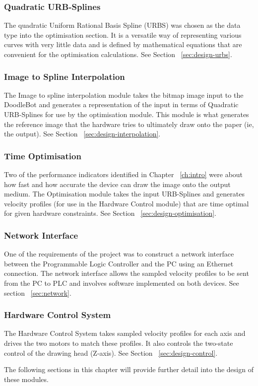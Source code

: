 	\subsubsection*{Quadratic URB-Splines}
		The quadratic Uniform Rational Basis Spline (URBS) was chosen as the data type into the optimisation section. It is a versatile way of representing various curves with very little data and is defined by mathematical equations that are convenient for the optimisation calculations. See Section ~\ref{sec:design-urbs}.
		
	\subsubsection*{Image to Spline Interpolation}
		The Image to spline interpolation module takes the bitmap image input to the DoodleBot and generates a representation of the input in terms of Quadratic URB-Splines for use by the optimisation module. This module is what generates the reference image that the hardware tries to ultimately draw onto the paper (ie, the output). See Section ~\ref{sec:design-interpolation}.
		
	\subsubsection*{Time Optimisation}
		Two of the performance indicators identified in Chapter ~\ref{ch:intro} were about how fast and how accurate the device can draw the image onto the output medium. The Optimisation module takes the input URB-Splines and generates velocity profiles (for use in the Hardware Control module) that are time optimal for given hardware constraints. See Section ~\ref{sec:design-optimisation}.

	\subsubsection*{Network Interface}
		One of the requirements of the project was to construct a network interface between the Programmable Logic Controller and the PC using an Ethernet connection. The network interface allows the sampled velocity profiles to be sent from the PC to PLC and involves software implemented on both devices. See section ~\ref{sec:network}.

	\subsubsection*{Hardware Control System}
		The Hardware Control System takes sampled velocity profiles for each axis and drives the two motors to match these profiles. It also controls the two-state control of the drawing head (Z-axis). See Section ~\ref{sec:design-control}.
		
The following sections in this chapter will provide further detail into the design of these modules.